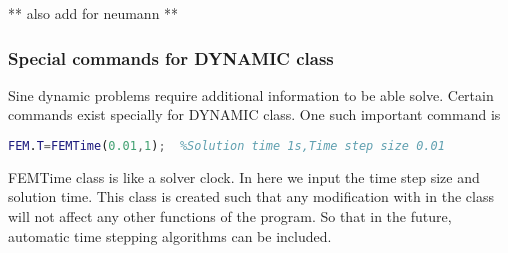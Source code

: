 \documentclass[main.tex]{subfiles}
\begin{document}
** also add for neumann ** 

\subsubsection{Special commands for DYNAMIC class}

Sine dynamic problems require additional information to be able solve. Certain commands exist specially for DYNAMIC class. One such important command is 
\begin{lstlisting}[language=matlab]
FEM.T=FEMTime(0.01,1);	%Solution time 1s,Time step size 0.01 
\end{lstlisting}
FEMTime class is like a solver clock. In here we input the time step size and solution time. This class is created such that any modification with in the class will not affect any other functions of the program. So that in the future, automatic time stepping algorithms can be included.
\end{document}
